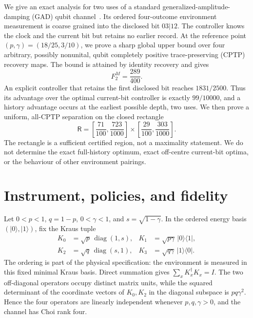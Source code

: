 \documentclass[11pt]{article}
\newcommand{\diag}{\operatorname{diag}}
\begin{document}
We give an exact analysis for two uses of a standard generalized-amplitude-damping
(GAD) qubit channel~\cite{CafaroVanLoock2014}. Its ordered four-outcome environment
measurement is coarse grained into the disclosed bit $03|12$. The controller knows
the clock and the current bit but retains no earlier record. At the reference point
$(p,\gamma)=(18/25,3/10)$, we prove a sharp global upper bound over four arbitrary,
possibly nonunital, qubit completely positive trace-preserving (CPTP) recovery maps.
The bound is attained by identity recovery and gives
\begin{equation}
  F_2^M=\frac{289}{400}.
  \label{eq:intro-optimum}
\end{equation}
An explicit controller that retains the first disclosed bit reaches $1831/2500$.
Thus its advantage over the optimal current-bit controller is exactly $99/10000$,
and a history advantage occurs at the earliest possible depth, two uses. We then
prove a uniform, all-CPTP separation on the closed rectangle
\begin{equation}
 \mathsf R=\left[\frac{71}{100},\frac{723}{1000}\right]
 \times\left[\frac{29}{100},\frac{303}{1000}\right].
 \label{eq:intro-rectangle}
\end{equation}
The rectangle is a sufficient certified region, not a maximality statement. We do
not determine the exact full-history optimum, exact off-centre current-bit optima,
or the behaviour of other environment pairings.

\section{Instrument, policies, and fidelity}
\label{sec:model}

Let $0<p<1$, $q=1-p$, $0<\gamma<1$, and $s=\sqrt{1-\gamma}$.
In the ordered energy basis $(|0\rangle,|1\rangle)$, fix the Kraus tuple
\begin{equation}
 \begin{aligned}
 K_0&=\sqrt p\,\diag(1,s), &
 K_1&=\sqrt{p\gamma}\,|0\rangle\langle1|,\\
 K_2&=\sqrt q\,\diag(s,1), &
 K_3&=\sqrt{q\gamma}\,|1\rangle\langle0|.
 \end{aligned}
 \label{eq:kraus}
\end{equation}
The ordering is part of the physical specification: the environment is measured in
this fixed minimal Kraus basis. Direct summation gives
$\sum_xK_x^\dagger K_x=I$. The two off-diagonal operators occupy distinct matrix
units, while the squared determinant of the coordinate vectors of $K_0,K_2$ in the
diagonal subspace is $pq\gamma^2$. Hence the four operators are linearly independent
whenever $p,q,\gamma>0$, and the channel has Choi rank four.
\end{document}
